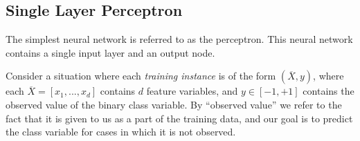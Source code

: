 \documentclass{tufte-handout}
\begin{document}
\subsection{Single Layer Perceptron}%
The simplest neural network is referred to as the perceptron. This neural network contains
a single input layer and an output node.\cite{inbook:Aggarwal-1.2}

Consider a situation where each \textit{training instance} is of the form $(\overline{X}, y)$, where each $\overline{X} = [x_1,..., x_d]$ contains $d$ feature variables, and $y \in [-1, +1]$ contains the observed value of the binary class variable. By “observed value” we refer to the fact that it is given to us as a part of the training data, and our goal is to predict the class variable for cases in which it is not observed.
\end{document}
